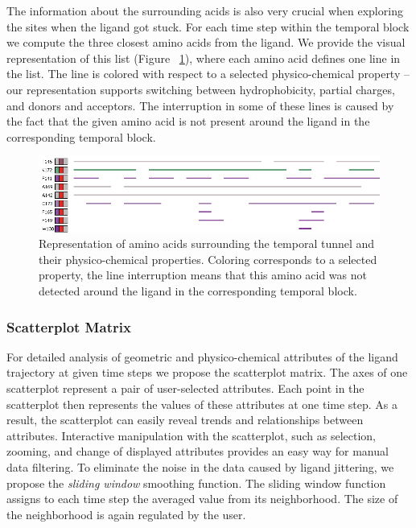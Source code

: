 \documentclass[twocolumn]{bmcart}%
\begin{document}
The information about the surrounding acids is also very crucial when exploring the sites when the ligand got stuck. 
For each time step within the temporal block we compute the three closest amino acids from the ligand. 
We provide the visual representation of this list (Figure ~\ref{fig:aacids}), where each amino acid defines one line in the list. 
The line is colored with respect to a selected physico-chemical property -- our representation supports switching between hydrophobicity, partial charges, and donors and acceptors.
The interruption in some of these lines is caused by the fact that the given amino acid is not present around the ligand in the corresponding temporal block.

\begin{figure}[htb]
	\centering
  \includegraphics[width=0.95\linewidth]{img/aacids.png}
  \caption{\label{fig:aacids} Representation of amino acids surrounding the temporal tunnel and their physico-chemical properties. Coloring corresponds to a selected property, the line interruption means that this amino acid was not detected around the ligand in the corresponding temporal block.}
\end{figure}

\subsubsection*{Scatterplot Matrix}
For detailed analysis of geometric and physico-chemical attributes of the ligand trajectory at given time steps we propose the scatterplot matrix.
The axes of one scatterplot represent a pair of user-selected attributes.
Each point in the scatterplot then represents the values of these attributes at one time step.
As a result, the scatterplot can easily reveal trends and relationships between attributes.
Interactive manipulation with the scatterplot, such as selection, zooming, and change of displayed attributes provides an easy way for manual data filtering. 
To eliminate the noise in the data caused by ligand jittering, we propose the \textit{sliding window} smoothing function.
The sliding window function assigns to each time step the averaged value from its neighborhood.
The size of the neighborhood is again regulated by the user. 
\end{document}
